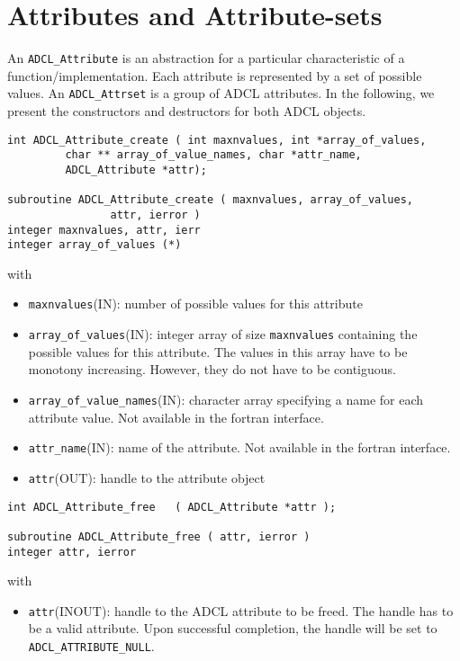 \section{Attributes and Attribute-sets}

An {\tt ADCL\_Attribute} is an abstraction for a particular characteristic of
a function/implementation. Each attribute is represented by a set of possible
values.  An {\tt ADCL\_Attrset} is a group of ADCL attributes.  In the
following, we present the constructors and destructors for both ADCL objects.

\begin{verbatim}
int ADCL_Attribute_create ( int maxnvalues, int *array_of_values, 
         char ** array_of_value_names, char *attr_name, 
         ADCL_Attribute *attr);

subroutine ADCL_Attribute_create ( maxnvalues, array_of_values, 
                attr, ierror )
integer maxnvalues, attr, ierr
integer array_of_values (*)
\end{verbatim}
with
\begin{itemize}
\item {\tt maxnvalues}(IN): number of possible values for this attribute
\item {\tt array\_of\_values}(IN): integer array of size {\tt maxnvalues} containing the possible values for this 
  attribute. The values in this array have to be monotony increasing. However, they do not have to be contiguous.
\item {\tt array\_of\_value\_names}(IN): character array specifying a name for
  each attribute value. Not available in the fortran interface.
\item {\tt attr\_name}(IN): name of the attribute. Not available in the
  fortran interface.
\item {\tt attr}(OUT): handle to the attribute object
\end{itemize} 	

\hspace{1cm}
\begin{verbatim}
int ADCL_Attribute_free   ( ADCL_Attribute *attr );

subroutine ADCL_Attribute_free ( attr, ierror )
integer attr, ierror
\end{verbatim}
with
\begin{itemize}
\item {\tt attr}(INOUT): handle to the ADCL attribute to be freed. The handle has to be a valid attribute.
    	Upon successful completion, the handle will be set to {\tt ADCL\_ATTRIBUTE\_NULL}.
\end{itemize}

